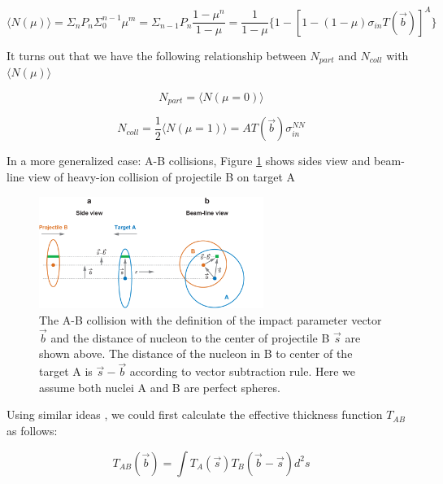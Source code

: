 \begin{equation}
\langle N(\mu) \rangle = \Sigma_n P_n \Sigma^{n-1}_0 \mu^m =  \Sigma_{n-1} P_n \frac{1 - \mu^n}{1 - \mu} = \frac{1}{1-\mu} \{ 1 - [1 - (1-\mu) \sigma_{in} T(\vec{b})]^A \}
\end{equation}

It turns out that we have the following relationship between $N_{part}$ and $N_{coll}$ with $\langle  N(\mu) \rangle$  \cite{Glauber}

\begin{equation}
N_{part} = \langle N(\mu = 0) \rangle 
\end{equation}

\begin{equation}
N_{coll} = \frac{1}{2} \langle N(\mu = 1) \rangle = A T(\vec{b}) \sigma_{in}^{NN}
\end{equation}

In a more generalized case: A-B collisions, Figure \ref{GlauberRef} shows sides view and beam-line view of heavy-ion collision of projectile B on target A


\begin{figure}[hbtp]
\begin{center}
\includegraphics[width=0.65\textwidth]{Figures/Chapter1/GlauDefColl.png}
\caption{The A-B collision with the definition of the impact parameter vector $\vec{b}$ and the distance of nucleon to the center of projectile B $\vec{s}$ are shown above. The distance of the nucleon in B to center of the target A is $\vec{s}-\vec{b}$ according to vector subtraction rule. Here we assume both nuclei A and B are perfect spheres.}
\label{GlauberRef}
\end{center}
\end{figure} 

Using similar ideas \cite{CentPlot}, we could first calculate the effective thickness function $T_{AB}$ as follows:


\begin{equation}
T_{AB}(\vec{b}) = \int T_A(\vec{s}) T_B(\vec{b} - \vec{s}) d^2s 
\end{equation}



